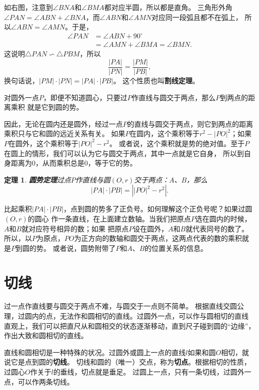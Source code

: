\documentclass[12pt,UTF8]{ctexbook}
\newtheorem{tm}{定理}[section]
\begin{document}
如右图，注意到$\angle BNA$和$\angle BMA$都对应半圆，所以都是直角。
三角形外角$\angle PAN = \angle ABN + \angle BNA$，而$\angle ABN$和$\angle AMN$对应同一段弧且都不在弧上，
所以$\angle ABN = \angle AMN$。于是，
\begin{align*}
    \angle PAN &= \angle ABN + 90^\circ  \\
    &= \angle AMN + \angle BMA =\angle BMN. 
\end{align*}
这说明$\triangle PAN \backsim \triangle PBM$，所以
$$ \frac{|PA|}{|PN|} = \frac{|PM|}{|PB|},$$
换句话说，$|PM|\cdot |PN| = |PA|\cdot |PB|$。
这个性质也叫\textbf{割线定理}。

对圆外一点$P$，即便不知道圆心，只要过$P$作直线与圆交于两点，那么$P$到两点的距离乘积
就是它到圆的势。

因此，无论在圆内还是圆外，经过一点$P$的直线与圆交于两点，则它到两点的距离乘积只与它和圆的远近关系有关。
如果$P$在圆内，这个乘积等于$r^2 - |PO|^2$；如果$P$在圆外，这个乘积等于$|PO|^2 - r^2$。
或者说，这个乘积就是势的绝对值。至于$P$在圆上的情形，我们可以认为它与圆交于两点，其中一点就是它自身，
所以到自身距离为$0$，从而乘积总是$0$，等于它的势。

\begin{tm}\textbf{圆势定理}\label{tm:0-3-40}
    过点$P$作直线与圆$(O, r)$交于两点：$A$、$B$，那么
    $$ |PA| \cdot |PB| = \left||PO|^2 - r^2\right|. $$
\end{tm}

比起乘积$|PA| \cdot |PB|$，点到圆的势多了正负号。如何理解这个正负号呢？如果过圆$(O,r)$的圆心
作一条直线，在上面建立数轴。当我们把原点$P$选在圆内的时候，$A$和$B$就对应符号相异的数；如果
把原点$P$设在圆外，$A$和$B$就代表同号的数了。
所以，以$P$为原点，$PO$为正方向的数轴和圆交于两点，这两点代表的数的乘积就是$P$到圆的势。
或者说，圆势附带了$P$和$A$、$B$的位置关系的信息。


\section{切线}
过一点作直线要与圆交于两点不难，与圆交于一点则不简单。
根据直线交圆公理，过圆内的点，无法作和圆相切的直线。过圆外一点，可以作与圆相切的直线
直观上，我们可以把直尺从和圆相交的状态逐渐移动，直到尺子碰到圆的“边缘”，作出大致和圆相切的直线。

直线和圆相切是一种特殊的状况。过圆外或圆上一点的直线$l$如果和圆$O$相切，就说它是点到圆的\textbf{切线}。
切线和圆的（唯一）交点，称为\textbf{切点}。根据相切的性质，过圆心$O$作关于$l$的垂线，切点就是垂足。
过圆上一点，只有一条切线，过圆外一点，可以作两条切线。
\end{document}

